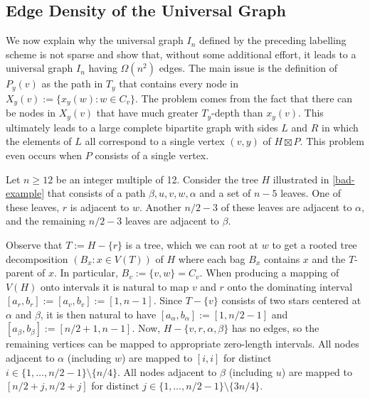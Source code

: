 \documentclass{patmorin}
\begin{document}
\subsection{Edge Density of the Universal Graph}
\label{density-lower-bound}

We now explain why the universal graph $I_n$ defined by the preceding labelling scheme is not sparse and show that, without some additional effort, it leads to a universal graph $I_n$ having $\Omega(n^2)$ edges.  The main issue is the definition of $P_y(v)$ as the path in $T_y$ that contains every node in $X_y(v):=\{x_y(w):w\in C_v\}$.  The problem comes from the fact that there can be nodes in $X_y(v)$ that have much greater $T_y$-depth than $x_y(v)$.  This ultimately leads to a large complete bipartite graph with sides $L$ and $R$ in which the elements of $L$ all correspond to a single vertex $(v,y)$ of $H\boxtimes P$.  This problem even occurs when $P$ consists of a single vertex.

Let $n\ge 12$ be an integer multiple of 12. Consider the tree $H$ illustrated in \cref{bad-example} that consists of a path $\beta,u,v,w,\alpha$ and a set of $n-5$ leaves.  One of these leaves, $r$ is adjacent to $w$. Another $n/2-3$ of these leaves are adjacent to $\alpha$, and the remaining $n/2-3$ leaves are adjacent to $\beta$.

Observe that $T:=H-\{r\}$ is a tree, which we can root at $w$ to get a rooted tree decomposition $(B_x:x\in V(T))$ of $H$ where each bag $B_x$ contains $x$ and the $T$-parent of $x$.  In particular, $B_v:=\{v,w\}=C_v$.  When producing a mapping of $V(H)$ onto intervals it is natural to map $v$ and $r$ onto the dominating interval $[a_r,b_r]:=[a_v,b_v]:=[1,n-1]$.  Since $T-\{v\}$ consists of two stars centered at $\alpha$ and $\beta$, it is then natural to have $[a_\alpha,b_\alpha]:=[1, n/2-1]$ and $[a_\beta,b_\beta]:=[ n/2+1,n-1]$. Now, $H-\{v,r,\alpha,\beta\}$ has no edges, so the remaining vertices can be mapped to appropriate zero-length intervals. All nodes adjacent to $\alpha$ (including $w$) are mapped to $[i,i]$ for distinct $i\in\{1,\ldots, n/2-1\}\setminus\{n/4\}$. All nodes adjacent to $\beta$ (including $u$) are mapped to $[n/2+j, n/2+j]$ for distinct $j\in\{1,\ldots, n/2-1\}\setminus\{3n/4\}$.
\end{document}
